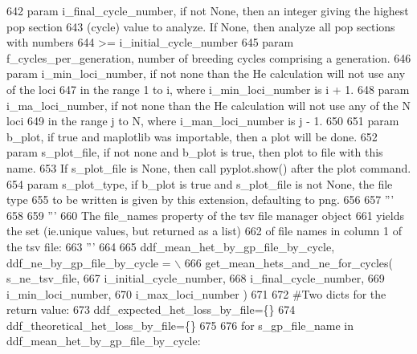 \begin{DoxyCode}
642 \textcolor{stringliteral}{    param i\_final\_cycle\_number, if not None, then an integer giving the highest pop section}
643 \textcolor{stringliteral}{        (cycle) value to analyze.  If None, then analyze all pop sections with numbers }
644 \textcolor{stringliteral}{        >= i\_initial\_cycle\_number}
645 \textcolor{stringliteral}{    param f\_cycles\_per\_generation, number of breeding cycles comprising a generation.}
646 \textcolor{stringliteral}{    param i\_min\_loci\_number, if not none than the He calculation will not use any of the loci}
647 \textcolor{stringliteral}{            in the range 1 to i, where i\_min\_loci\_number is i + 1.}
648 \textcolor{stringliteral}{    param i\_ma\_loci\_number, if not none than the He calculation will not use any of the N loci}
649 \textcolor{stringliteral}{            in the range j to N, where i\_man\_loci\_number is j - 1.}
650 \textcolor{stringliteral}{}
651 \textcolor{stringliteral}{    param b\_plot, if true and maplotlib was importable, then a plot will be done.}
652 \textcolor{stringliteral}{    param s\_plot\_file, if not none and b\_plot is true, then plot to file with this name.}
653 \textcolor{stringliteral}{            If s\_plot\_file is None, then call pyplot.show() after the plot command.}
654 \textcolor{stringliteral}{    param s\_plot\_type, if b\_plot is true and s\_plot\_file is not None, the file type}
655 \textcolor{stringliteral}{            to be written is given by this extension, defaulting to png.}
656 \textcolor{stringliteral}{}
657 \textcolor{stringliteral}{    '''}
658 
659     \textcolor{stringliteral}{'''}
660 \textcolor{stringliteral}{    The file\_names property of the tsv file manager object}
661 \textcolor{stringliteral}{    yields the set (ie.unique values, but returned as a list) }
662 \textcolor{stringliteral}{    of file names in column 1 of the tsv file:}
663 \textcolor{stringliteral}{    '''}
664 
665     ddf\_mean\_het\_by\_gp\_file\_by\_cycle, ddf\_ne\_by\_gp\_file\_by\_cycle = \(\backslash\)
666             get\_mean\_hets\_and\_ne\_for\_cycles( s\_ne\_tsv\_file, 
667                                                 i\_initial\_cycle\_number,
668                                                 i\_final\_cycle\_number, 
669                                                 i\_min\_loci\_number, 
670                                                 i\_max\_loci\_number )
671 
672     \textcolor{comment}{#Two dicts for the return value:}
673     ddf\_expected\_het\_loss\_by\_file=\{\}
674     ddf\_theoretical\_het\_loss\_by\_file=\{\}
675 
676     \textcolor{keywordflow}{for} s\_gp\_file\_name \textcolor{keywordflow}{in} ddf\_mean\_het\_by\_gp\_file\_by\_cycle:

\end{DoxyCode}

